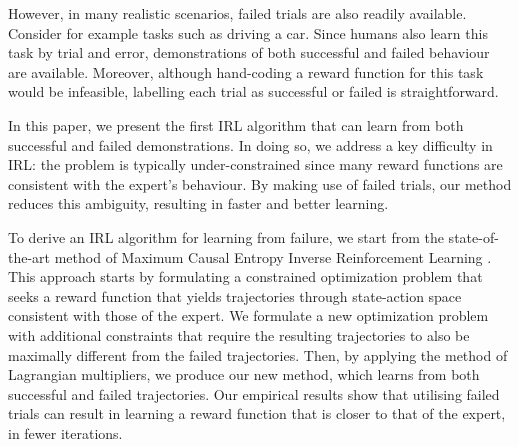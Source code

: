 \documentclass[conference]{IEEEtran}
\begin{document}
%


However, in many realistic scenarios, failed trials are also readily available.  Consider for example tasks such as driving a car.  Since humans also learn this task by trial and error, demonstrations of both successful and failed behaviour are available. Moreover, although hand-coding a reward function for this task would be infeasible, labelling each trial as successful or failed is straightforward.

In this paper, we present the first IRL algorithm that can learn from both successful and failed demonstrations.  In doing so, we address a key difficulty in IRL: the problem is typically under-constrained since many reward functions are consistent with the expert's behaviour.  By making use of failed trials, our method reduces this ambiguity, resulting in faster and better learning.

To derive an IRL algorithm for learning from failure, we start from the state-of-the-art method of Maximum Causal Entropy Inverse Reinforcement Learning \cite{ziebart2008maximum}.  This approach starts by formulating a constrained optimization problem that seeks a reward function that yields trajectories through state-action space consistent with those of the expert.  We formulate a new optimization problem with additional constraints that require the resulting trajectories to also be maximally different from the failed trajectories. Then, by applying the method of Lagrangian multipliers, we produce our new method, which learns from both successful and failed trajectories.
	Our empirical results show that utilising failed trials can result in learning  a reward function that is closer to that of the expert, in fewer iterations.



\end{document}
